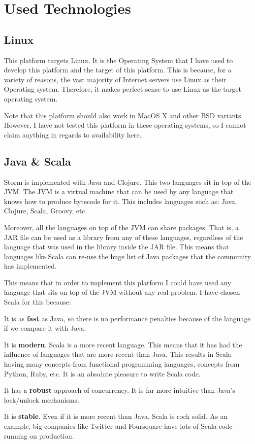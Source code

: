  
\section{Used Technologies}

\subsection{Linux}

This platform targets Linux. It is the Operating System that I have used to
develop this platform and the target of this platform. This is because, for a
variety of reasons, the vast majority of Internet servers use Linux as their
Operating system. Therefore, it makes perfect sense to use Linux as the target
operating system.

Note that this platform should also work in MacOS X and other BSD variants.
However, I have not tested this platform in these operating systems, so I
cannot claim anything in regards to availability here.

\subsection{Java \& Scala}

Storm is implemented with Java and Clojure. This two languages sit in top of
the JVM. The JVM is a virtual machine that can be used by any language that
knows how to produce bytecode for it. This includes languages such as: Java,
Clojure, Scala, Groovy, etc.

Moreover, all the languages on top of the JVM can share packages. That is, a
JAR file can be used as a library from any of these languages, regardless of
the language that was used in the library inside the JAR file. This means that
languages like Scala can re-use the huge list of Java packages that the
community has implemented.

This means that in order to implement this platform I could have used any
language that sits on top of the JVM without any real problem. I have chosen
Scala for this because:

\mylist
  \item It is as {\bf fast} as Java, so there is no performance penalties
because of the language if we compare it with Java.
  \item It is {\bf modern}. Scala is a more recent language. This means that it
has had the influence of languages that are more recent than Java. This results
in Scala having many concepts from functional programming languages, concepts
from Python, Ruby, etc. It is an absolute pleasure to write Scala code.
  \item It has a {\bf robust} approach of concurrency. It is far more intuitive
than Java's lock/unlock mechanisms.
  \item It is {\bf stable}. Even if it is more recent than Java, Scala is rock
solid. As an example, big companies like Twitter and Foursquare have lots of
Scala code running on production.
\mylistend

